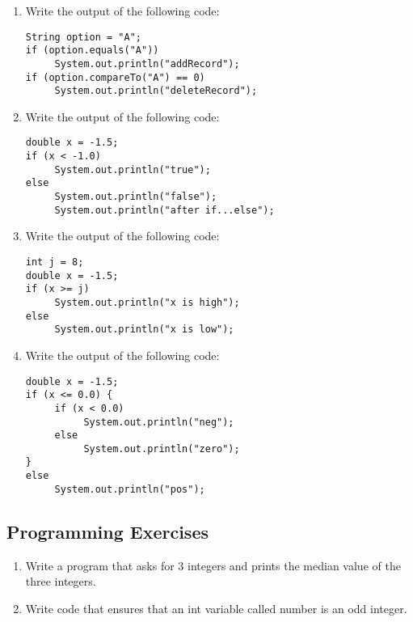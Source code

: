 \begin{enumerate}[label={\arabic{counter}\addtocounter{counter}{1}}.]
\item Write the output of the following code:
\begin{lstlisting}
String option = "A";
if (option.equals("A"))
     System.out.println("addRecord");
if (option.compareTo("A") == 0)
     System.out.println("deleteRecord");
\end{lstlisting}

\item Write the output of the following code:
\begin{lstlisting}
double x = -1.5;
if (x < -1.0)
     System.out.println("true");
else
     System.out.println("false");
     System.out.println("after if...else");
\end{lstlisting}

\item Write the output of the following code:
\begin{lstlisting}
int j = 8;
double x = -1.5;
if (x >= j)
     System.out.println("x is high");
else
     System.out.println("x is low");
\end{lstlisting}

\item Write the output of the following code:
\begin{lstlisting}
double x = -1.5;
if (x <= 0.0) {
     if (x < 0.0)
          System.out.println("neg");
     else
          System.out.println("zero");
}
else
     System.out.println("pos");
\end{lstlisting}

\end{enumerate}

\subsection{Programming Exercises}

\setcounter{counter}{1}
\begin{enumerate}[label={\arabic{counter}\addtocounter{counter}{1}}.]

\item Write a program that asks for 3 integers and prints the median value of the three integers.

\item Write code that ensures that an int variable called number is an odd integer.

\end{enumerate}